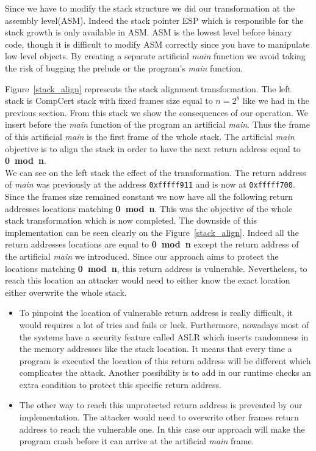 \documentclass[11pt]{sdm}
\begin{document}
Since we have to modify the stack structure we did our transformation at the assembly level(ASM). Indeed the stack pointer ESP which is responsible for the stack growth is only available in ASM. ASM is the lowest level before binary code, though it is difficult to modify ASM correctly since you have to manipulate low level objects. 
By creating a separate artificial \textit{main} function we avoid taking the risk of bugging the prelude or the program's \textit{main} function.

Figure~\ref{stack_align} represents the stack alignment transformation. The left stack is CompCert stack with fixed frames size equal to $n=2^8$ like we had in the previous section. From this stack we show the consequences of our operation. We insert before the \textit{main} function of the program an artificial \textit{main}. Thus the frame of this artificial \textit{main} is the first frame of the whole stack. The artificial \textit{main} objective is to align the stack in order to have the next return address equal to \textbf{0~mod~n}. \\
We can see on the left stack the effect of the transformation. The return address of \textit{main} was previously at the address \texttt{0xfffff911} and is now at \texttt{0xfffff700}. Since the frames size remained constant we now have all the following return addresses locations matching \textbf{0~mod~n}. This was the objective of the whole stack transformation which is now completed.
The downside of this implementation can be seen clearly on the Figure~\ref{stack_align}. Indeed all the return addresses locations are equal to \textbf{0~mod~n} except the return address of the artificial \textit{main} we introduced.
Since our approach aims to protect the locations matching \textbf{0~mod~n}, this return address is vulnerable.
Nevertheless, to reach this location an attacker would need to either know the exact location either overwrite the whole stack.
\begin{itemize}
	\item To pinpoint the location of vulnerable return address is really difficult, it would requires a lot of tries and fails or luck. Furthermore, nowadays most of the systems have a security feature called ASLR which inserts randomness in the memory addresses like the stack location. It means that every time a program is executed the location of this return address will be different which complicates the attack. Another possibility is to add in our runtime checks an extra condition to protect this specific return address.
	\item The other way to reach this unprotected return address is prevented by our implementation. The attacker would need to overwrite other frames return address to reach the vulnerable one. In this case our approach will make the program crash before it can arrive at the artificial \textit{main} frame.
\end{itemize}
\end{document}

